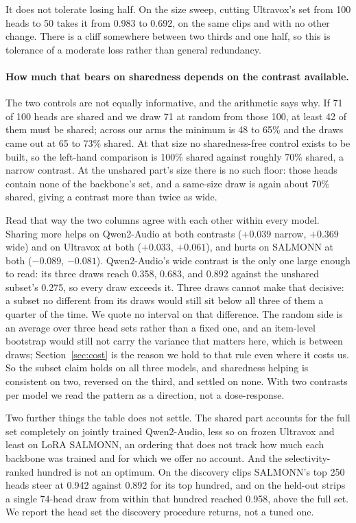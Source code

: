 \documentclass[11pt]{article}
\begin{document}
It does not tolerate losing half. On the size sweep, cutting Ultravox's set from
100 heads to 50 takes it from 0.983 to 0.692, on the same clips and with no other
change. There is a cliff somewhere between two thirds and one half, so this is
tolerance of a moderate loss rather than general redundancy.

\paragraph{How much that bears on sharedness depends on the contrast available.}
The two controls are not equally informative, and the arithmetic says why. If 71
of 100 heads are shared and we draw 71 at random from those 100, at least 42 of
them must be shared; across our arms the minimum is 48 to 65\% and the draws came
out at 65 to 73\% shared. At that size no sharedness-free control exists to be
built, so the left-hand comparison is 100\% shared against roughly 70\% shared, a
narrow contrast. At the unshared part's size there is no such floor: those heads
contain none of the backbone's set, and a same-size draw is again about 70\%
shared, giving a contrast more than twice as wide.

Read that way the two columns agree with each other within every model. Sharing
more helps on Qwen2-Audio at both contrasts ($+0.039$ narrow, $+0.369$ wide) and
on Ultravox at both ($+0.033$, $+0.061$), and hurts on SALMONN at both
($-0.089$, $-0.081$). Qwen2-Audio's wide contrast is the only one large enough to
read: its three draws reach 0.358, 0.683, and 0.892 against the unshared subset's
0.275, so every draw exceeds it. Three draws cannot make that decisive: a
subset no different from its draws would still sit below all three of them a
quarter of the time. We quote no interval on that difference. The
random side is an average over three head sets rather than a fixed one, and an
item-level bootstrap would still not carry the variance that matters here, which
is between draws; Section~\ref{sec:cost} is the reason we hold to that rule even
where it costs us. So the subset claim holds on all three models, and sharedness
helping is consistent on two, reversed on the third, and settled on none. With two contrasts per model we read the pattern as a direction, not a
dose-response.

Two further things the table does not settle. The shared part accounts for the
full set completely on jointly trained Qwen2-Audio, less so on frozen Ultravox
and least on LoRA SALMONN, an ordering that does not track how much each backbone
was trained and for which we offer no account. And the selectivity-ranked hundred
is not an optimum. On the
discovery clips SALMONN's top 250 heads steer at 0.942 against 0.892 for its top
hundred, and on the held-out strips a single 74-head draw from within that
hundred reached 0.958, above the full set. We report the head set the discovery
procedure returns, not a tuned one.
\end{document}
